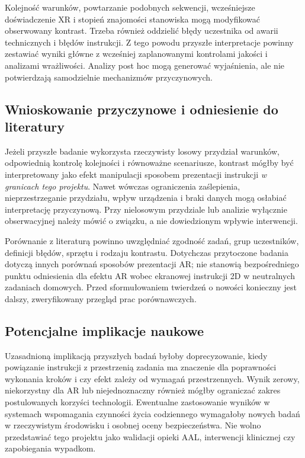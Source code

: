 \documentclass[11pt,a4paper]{article}
\begin{document}
Kolejność warunków, powtarzanie podobnych sekwencji, wcześniejsze doświadczenie XR i stopień znajomości stanowiska mogą modyfikować obserwowany kontrast. Trzeba również oddzielić błędy uczestnika od awarii technicznych i błędów instrukcji. Z tego powodu przyszłe interpretacje powinny zestawiać wyniki główne z wcześniej zaplanowanymi kontrolami jakości i analizami wrażliwości. Analizy post hoc mogą generować wyjaśnienia, ale nie potwierdzają samodzielnie mechanizmów przyczynowych.

\subsection{Wnioskowanie przyczynowe i odniesienie do literatury}
Jeżeli przyszłe badanie wykorzysta rzeczywisty losowy przydział warunków, odpowiednią kontrolę kolejności i równoważne scenariusze, kontrast mógłby być interpretowany jako efekt manipulacji sposobem prezentacji instrukcji \emph{w granicach tego projektu}. Nawet wówczas ograniczenia zaślepienia, nieprzestrzeganie przydziału, wpływ urządzenia i braki danych mogą osłabiać interpretację przyczynową. Przy nielosowym przydziale lub analizie wyłącznie obserwacyjnej należy mówić o związku, a nie dowiedzionym wpływie interwencji.

Porównanie z literaturą powinno uwzględniać zgodność zadań, grup uczestników, definicji błędów, sprzętu i rodzaju kontrastu. Dotychczas przytoczone badania dotyczą innych porównań sposobów prezentacji AR; nie stanowią bezpośredniego punktu odniesienia dla efektu AR wobec ekranowej instrukcji 2D w neutralnych zadaniach domowych. Przed sformułowaniem twierdzeń o nowości konieczny jest dalszy, zweryfikowany przegląd prac porównawczych.

\subsection{Potencjalne implikacje naukowe}
Uzasadnioną implikacją przyszłych badań byłoby doprecyzowanie, kiedy powiązanie instrukcji z przestrzenią zadania ma znaczenie dla poprawności wykonania kroków i czy efekt zależy od wymagań przestrzennych. Wynik zerowy, niekorzystny dla AR lub niejednoznaczny również mógłby ograniczać zakres postulowanych korzyści technologii. Ewentualne zastosowanie wyników w systemach wspomagania czynności życia codziennego wymagałoby nowych badań w rzeczywistym środowisku i osobnej oceny bezpieczeństwa. Nie wolno przedstawiać tego projektu jako walidacji opieki AAL, interwencji klinicznej czy zapobiegania wypadkom.
\end{document}
